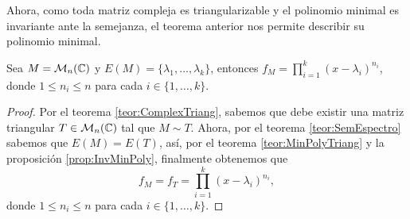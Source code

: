 Ahora, como toda matriz compleja es triangularizable y el polinomio minimal es invariante ante la semejanza, el teorema anterior nos permite describir su polinomio minimal.

\begin{coro}
  Sea $M = \mathcal{M}_n(\mathbb{C})$ y $E(M) = \{\lambda_1,\ldots,\lambda_k\}$, entonces $ f_M = \prod_{i=1}^k (x-\lambda_i)^{n_i}$, donde $1 \leq n_i \leq n$ para cada $i \in \{1,\ldots,k\}$.
\end{coro}
\begin{proof}
  Por el teorema \ref{teor:ComplexTriang}, sabemos que debe existir una matriz triangular $T \in \mathcal{M}_n(\mathbb{C})$ tal que $M \sim T$. Ahora, por el teorema \ref{teor:SemEspectro} sabemos que $E(M) = E(T)$, así, por el teorema \ref{teor:MinPolyTriang} y la proposición \ref{prop:InvMinPoly}, finalmente obtenemos que
  \[
    f_M = f_T = \prod_{i=1}^k (x-\lambda_i)^{n_i},
  \]
donde $1 \leq n_i \leq n$ para cada $i \in \{1,\ldots,k\}$.
\end{proof}
